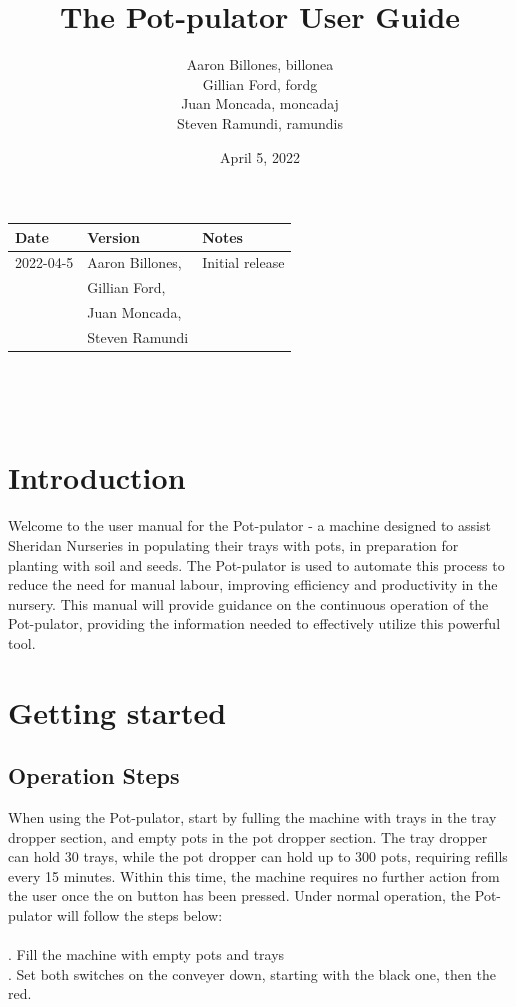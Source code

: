 \documentclass[12pt, titlepage]{article}
\title{The Pot-pulator User Guide}
\author{Aaron Billones, billonea\\Gillian Ford, fordg\\Juan Moncada, moncadaj\\Steven Ramundi, ramundis}
\date{April 5, 2022}
\begin{document}
\maketitle
\thispagestyle{empty}


\begin{tabularx}{\textwidth}{p{3cm}p{4cm}X}
    \toprule {\bf Date} & {\bf Version} & {\bf Notes}\\
    \midrule
    2022-04-5 & Aaron Billones,& Initial release\\&Gillian Ford,\\&Juan Moncada,\\&Steven Ramundi \\
    
    \bottomrule
\end{tabularx}

~\newpage

\tableofcontents

~\newpage


\section{Introduction}

Welcome to the user manual for the Pot-pulator - a machine designed to assist Sheridan Nurseries in populating their trays with pots, in preparation for planting with soil and seeds. The Pot-pulator is used to automate this process to reduce the need for manual labour, improving efficiency and productivity in the nursery. This manual will provide guidance on the continuous operation of the Pot-pulator, providing the information needed to effectively utilize this powerful tool.

\section{Getting started}

\subsection{Operation Steps}
When using the Pot-pulator, start by fulling the machine with trays in the tray dropper section, and empty pots in the pot dropper section. The tray dropper can hold 30 trays, while the pot dropper can hold up to 300 pots, requiring refills every 15 minutes. Within this time, the machine requires no further action from the user once the on button has been pressed. Under normal operation, the Pot-pulator will follow the steps below:
\\
\\ .	Fill the machine with empty pots and trays\\ 
.	Set both switches on the conveyer down, starting with the black one, then the red.
\end{document}
